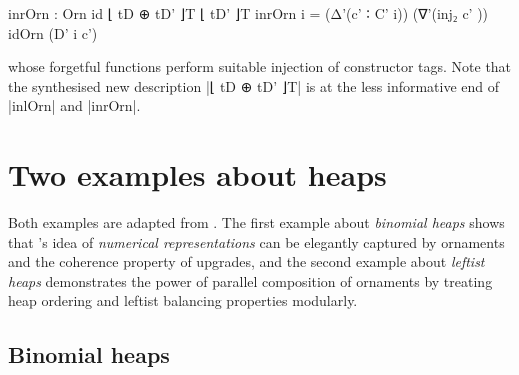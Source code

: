 {\begin{code}
inrOrn  : Orn id ⌊ tD ⊕ tD' ⌋T ⌊ tD' ⌋T
inrOrn  i  =  (Δ'(c'  ∶ C' i))  (∇'(inj₂  c'  ))  idOrn (D' i c')
\end{code}
whose forgetful functions perform suitable injection of constructor tags.
Note that the synthesised new description |⌊ tD ⊕ tD' ⌋T| is at the less informative end of |inlOrn| and |inrOrn|.}

\section{Two examples about heaps}

Both examples are adapted from .
The first example about \emph{binomial heaps} shows that \citeauthor{Okasaki-data-structures}'s idea of \emph{numerical representations} can be elegantly captured by ornaments and the coherence property of upgrades, and the second example about \emph{leftist heaps} demonstrates the power of parallel composition of ornaments by treating heap ordering and leftist balancing properties modularly.

\subsection{Binomial heaps}

